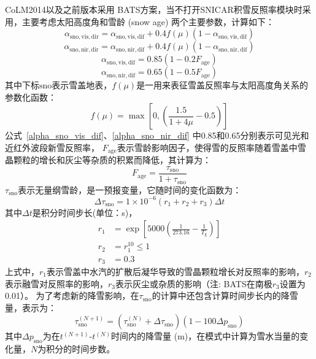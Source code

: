 CoLM2014以及之前版本采用 \citet{dickinson1986biosphere} BATS方案，当不打开SNICAR积雪反照率模块时采用，主要考虑太阳高度角和雪龄 (snow age) 两个主要参数，计算如下：
\begin{equation}
  \alpha_{\mathrm{sno, vis, dir}}=\alpha_{\mathrm{sno, vis, dif}}+0.4 f(\mu)\left(1-\alpha_{\mathrm{sno, vis, dif}}\right)
\end{equation}
%
\begin{equation}
  \alpha_{\mathrm{sno,nir,dir}}=\alpha_{\mathrm{sno, nir, dif}}+0.4 f(\mu)\left(1-\alpha_{\mathrm{sno,nir,dif}}\right)
\end{equation}
%
\begin{equation}\label{alpha_sno_vis_dif}
  \alpha_{\mathrm{sno,vis,dif}}=0.85\left(1-0.2 F_{\mathrm{age}}\right)
\end{equation}
%
\begin{equation}\label{alpha_sno_nir_dif}
  \alpha_{\mathrm{sno,nir,dif}}=0.65\left(1-0.5 F_{\mathrm{age}}\right)
\end{equation}
其中下标${\mathrm {sno}}$表示雪盖地表，$f(\mu)$是一用来表征雪盖反照率与太阳高度角关系的参数化函数：
\begin{equation}\label{fmu}
  f(\mu)=\max\left[0,\left(\frac{1.5}{1+4 \mu}-0.5\right)\right]
\end{equation}
公式~\eqref{alpha_sno_vis_dif}、\eqref{alpha_sno_nir_dif} 中0.85和0.65分别表示可见光和近红外波段新雪反照率，
$F_{\mathrm{age}}$表示雪龄影响因子，使得雪的反照率随着雪盖中雪晶颗粒的增长和灰尘等杂质的积累而降低，其计算为：
\begin{equation}
  F_{\mathrm{a g e}}=\frac{\tau_{\mathrm{sno}}}{1+\tau_{\mathrm{sno}}}
\end{equation}
$\tau_{\mathrm{sno}}$表示无量纲雪龄，是一预报变量，它随时间的变化函数为：
\begin{equation}
  \Delta \tau_{\mathrm{sno}}=1 \times 10^{-6}\left(r_{1}+r_{2}+r_{3}\right) \Delta t
\end{equation}
其中$\Delta t$是积分时间步长(单位：s)，
\begin{align}
  r_{1} &= \exp \left[5000\left(\frac{1}{273.16}-\frac{1}{T_{\mathrm{g}}}\right)\right] \\
  r_{2} &= r_{1}^{10} \leqslant 1 \\
  r_{3} &= 0.3
\end{align}
上式中，$r_1$表示雪盖中水汽的扩散后凝华导致的雪晶颗粒增长对反照率的影响，$r_2$表示融雪对反照率的影响，$r_3$表示灰尘或杂质的影响（注: BATS在南极$r_3$设置为0.01）。
为了考虑新的降雪影响，在$\tau_{\mathrm{sno}}$的计算中还包含计算时间步长内的降雪量，表示为：
\begin{equation}
  \tau_{\mathrm{sno}}^{(N+1)}=\left(\tau_{\mathrm{sno}}^{(N)}+\Delta \tau_{\mathrm{sno}}\right)\left(1-100 \Delta p_{\mathrm{sno}}\right)
\end{equation}
其中$\Delta p_{\mathrm{sno}}$为在$t^{(N+1)}$-$t^{(N)}$时间内的降雪量 (m)，在模式中计算为雪水当量的变化量，$N$为积分的时间步数。


